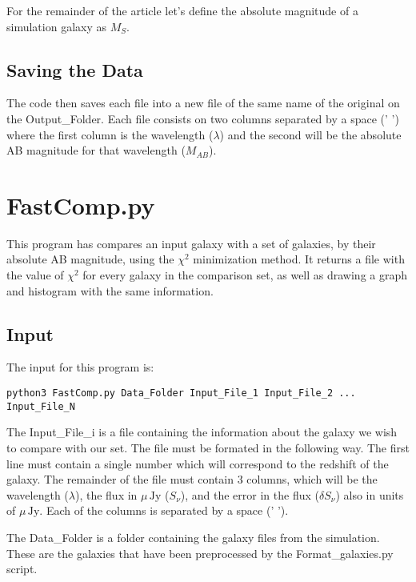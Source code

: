\documentclass[11pt]{article}
\newcommand{\unit}[1]{\ensuremath{\, \mathrm{#1}}}
\begin{document}
For the remainder of the article let's define the absolute magnitude of a simulation galaxy as $M_{S}$.

\subsection{Saving the Data}

The code then saves each file into a new file of the same name of the original on the Output\_Folder. Each file consists on two columns separated by a space (' ') where the first column is the wavelength ($\lambda$) and the second will be the absolute AB magnitude for that wavelength ($M_{AB}$).

\newpage


\section{FastComp.py}

This program has compares an input galaxy with a set of galaxies, by their absolute AB magnitude, using the $\chi^2$ minimization method. It returns a file with the value of $\chi^2$ for every galaxy in the comparison set, as well as drawing a graph and histogram with the same information.

\subsection{Input}

The input for this program is:
\begin{verbatim}
python3 FastComp.py Data_Folder Input_File_1 Input_File_2 ... Input_File_N
\end{verbatim}

The Input\_File\_i is a file containing the information about the galaxy we wish to compare with our set. The file must be formated in the following way. The first line must contain a single number which will correspond to the redshift of the galaxy. The remainder of the file must contain 3 columns, which will be the wavelength ($\lambda$), the flux in $\mu \unit{Jy}$ ($S_\nu$), and the error in the flux ($\delta S_\nu$) also in units of $\mu \unit{Jy}$.
Each of the columns is separated by a space (' ').

The Data\_Folder is a folder containing the galaxy files from the simulation. These are the galaxies that have been preprocessed by the Format\_galaxies.py script.
\end{document}
